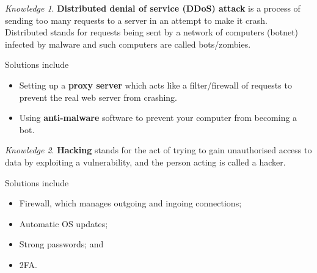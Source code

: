 \documentclass[8pt]{article}
\theoremstyle{remark}
\newtheorem{knowledge}{Knowledge}[subsection]
\begin{document}
            \begin{knowledge}
                \textbf{Distributed denial of service (DDoS) attack} is a process of sending too many requests to a server in an attempt to make it crash. Distributed stands for requests being sent by a network of computers (botnet) infected by malware and such computers are called bots/zombies.

                Solutions include
                \begin{itemize}
                    \item Setting up a \textbf{proxy server} which acts like a filter/firewall of requests to prevent the real web server from crashing.
                    \item Using \textbf{anti-malware} software to prevent your computer from becoming a bot.
                \end{itemize}
            \end{knowledge}

            \begin{knowledge}
                \textbf{Hacking} stands for the act of trying to gain unauthorised access to data by exploiting a vulnerability, and the person acting is called a hacker.

                Solutions include
                \begin{itemize}
                    \item Firewall, which manages outgoing and ingoing connections;
                    \item Automatic OS updates;
                    \item Strong passwords; and
                    \item 2FA.
                \end{itemize}
            \end{knowledge}
\end{document}
